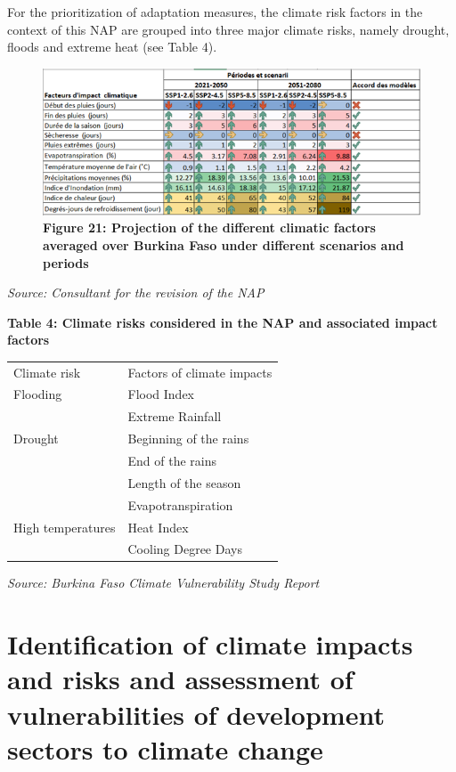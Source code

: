 \documentclass[
]{book}
\begin{document}
For the prioritization of adaptation measures, the climate risk factors in the context of this NAP are grouped into three major climate risks, namely drought, floods and extreme heat (see Table 4).

\begin{figure}
\centering
\includegraphics{Figures and Photos/Figure 21.png}
\caption{\textbf{Figure 21: Projection of the different climatic factors averaged over Burkina Faso under different scenarios and periods}}
\end{figure}

\emph{Source: Consultant for the revision of the NAP}

\textbf{Table 4: Climate risks considered in the NAP and associated impact factors}

\begin{tabular}{>{\raggedright\arraybackslash}p{12em}|l}
\hline
\multicolumn{2}{c}{Table 4: Climate risks considered in the NAP and associated impact factors} \\
\cline{1-2}
Climate risk & Factors of climate impacts\\
\hline
Flooding & Flood Index\\
\hline
 & Extreme Rainfall\\
\hline
Drought & Beginning of the rains\\
\hline
 & End of the rains\\
\hline
 & Length of the season\\
\hline
 & Evapotranspiration\\
\hline
High temperatures & Heat Index\\
\hline
 & Cooling Degree Days\\
\hline
\end{tabular}

\emph{Source: Burkina Faso Climate Vulnerability Study Report}

\section{Identification of climate impacts and risks and assessment of vulnerabilities of development sectors to climate change}\label{identification-of-climate-impacts-and-risks-and-assessment-of-vulnerabilities-of-development-sectors-to-climate-change}
\end{document}
